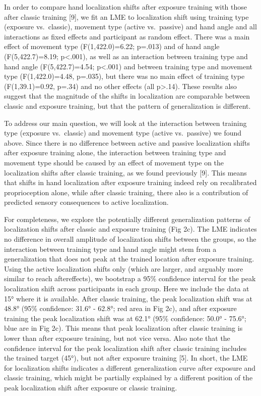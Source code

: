 \documentclass[10pt,letterpaper]{article}
\begin{document}
In order to compare hand localization shifts after exposure training
with those after classic training {[}9{]}, we fit an LME to localization
shift using training type (exposure vs.~classic), movement type (active
vs.~passive) and hand angle and all interactions as fixed effects and
participant as random effect. There was a main effect of movement type
(F(1,422.0)=6.22; p=.013) and of hand angle (F(5,422.7)=8.19;
p\textless{}.001), as well as an interaction between training type and
hand angle (F(5,422.7)=4.54; p\textless{}.001) and between training type
and movement type (F(1,422.0)=4.48, p=.035), but there was no main
effect of training type (F(1,39.1)=0.92, p=.34) and no other effects
(all p\textgreater{}.14). These results also suggest that the magnitude
of the shifts in localization are comparable between classic and
exposure training, but that the pattern of generalization is different.

To address our main question, we will look at the interaction between
training type (exposure vs.~classic) and movement type (active
vs.~passive) we found above. Since there is no difference between active
and passive localization shifts after exposure training alone, the
interaction between training type and movement type should be caused by
an effect of movement type on the localization shifts after classic
training, as we found previously {[}9{]}. This means that shifts in hand
localization after exposure training indeed rely on recalibrated
proprioception alone, while after classic training, there also is a
contribution of predicted sensory consequences to active localization.

For completeness, we explore the potentially different generalization
patterns of localization shifts after classic and exposure training (Fig
2c). The LME indicates no difference in overall amplitude of
localization shifts between the groups, so the interaction between
training type and hand angle might stem from a generalization that does
not peak at the trained location after exposure training. Using the
active localization shifts only (which are larger, and arguably more
similar to reach aftereffects), we bootstrap a 95\% confidence interval
for the peak localization shift across participants in each group. Here
we include the data at 15° where it is available. After classic
training, the peak localization shift was at 48.8° (95\% confidence:
31.6° - 62.8°; red area in Fig 2c), and after exposure training the peak
localization shift was at 62.1° (95\% confidence: 50.0° - 75.6°; blue
are in Fig 2c). This means that peak localization after classic training
is lower than after exposure training, but not vice versa. Also note
that the confidence interval for the peak localization shift after
classic training includes the trained target (45°), but not after
exposure training {[}5{]}. In short, the LME for localization shifts
indicates a different generalization curve after exposure and classic
training, which might be partially explained by a different position of
the peak localization shift after exposure or classic training.
\end{document}
